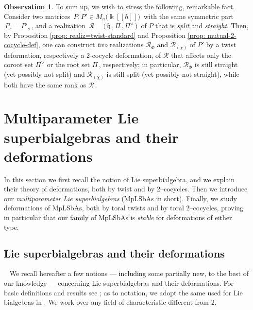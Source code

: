 \documentclass[12pt,reqno,twoside,a4paper]{amsart}
\numberwithin{equation}{section}
\theoremstyle{definition}
\newtheorem{free text}[lema]{}
\newtheorem{obs}[lema]{Observation}
\theoremstyle{remark}
\newcommand{\R}{{\mathcal R}}
\def \kh{{\Bbbk[[\hbar]]}}
\def \lieh{\mathfrak{h}}
\theoremstyle{plain}
\begin{document}
\begin{obs}  \label{obs: two deform's x P & R}
%
 To sum up, we wish to stress the following, remarkable fact.  Consider two matrices
 $ \, P , P' \in M_n\big(\kh\big) \, $
 with the same symmetric part  $ \, P_s = P'_s \, $,  and a realization
 $ \, \R = \big(\, \lieh \, , \Pi \, , \Pi^\vee \,\big) \, $  of  $ P $
 that is  \textsl{split\/}  and  \textsl{straight}.  Then, by
 Proposition \ref{prop: realiz=twist-standard}  and  Proposition \ref{prop: mutual-2-cocycle-def},
 one can construct  \textsl{two\/}  realizations  $ \R_{\scriptscriptstyle \Phi} $  and
 $ \R_{(\chi)} $  of  $ P' $  by a twist deformation,
 respectively a 2-cocycle deformation, of  $ \R $  that affects only the coroot set  $ \Pi^\vee $
 or the root set  $ \Pi \, $,  respectively; in particular,
 $ \R_{\scriptscriptstyle \Phi} $  is still straight (yet possibly not split) and  $ \R_{(\chi)} $
 is still split (yet possibly not straight),
 while both have the same rank as  $ \R \, $.
%
\end{obs}

\bigskip
 \medskip


\section{Multiparameter Lie superbialgebras and their deformations}  \label{sec: MpLSbAs}
%
 \vskip7pt
%
   In this section we first recall the notion of Lie superbialgebra, and we explain their theory of deformations, both by twist and by 2--cocycles.  Then we introduce our  \textsl{multiparameter Lie superbialgebras\/}  (MpLSbAs in short).  Finally, we study deformations of MpLSbAs, both by toral twists and by toral 2--cocycles, proving in particular that our family of MpLSbAs is  \textsl{stable}  for deformations of either type.

\medskip


\subsection{Lie superbialgebras and their deformations}  \label{subsec: Lie-supbialg's & deform's}  {\ }
%
 \vskip7pt
%
 We recall hereafter a few notions   --- including some partially new, to the best of our knowledge ---   concerning Lie superbialgebras and their deformations.  For basic definitions and results see  \cite{An,Ka2};  as to notation, we adopt the same used for Lie bialgebras in  \cite{GG3}.  We work over any field of characteristic different from 2.
\end{document}
